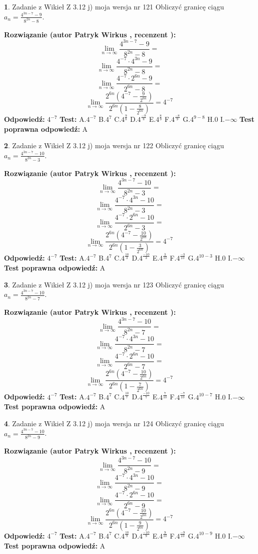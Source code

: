 \documentclass[12pt, a4paper]{article}
\theoremstyle{definition} %
\newtheorem{zad}{}
\newcommand{\zadStart}[1]{\begin{zad}#1\newline}
\newcommand{\zadStop}{\end{zad}}
\newcommand{\rozwStart}[2]{\noindent \textbf{Rozwiązanie (autor #1 , recenzent #2): }\newline}
\newcommand{\rozwStop}{\newline}
\newcommand{\odpStart}{\noindent \textbf{Odpowiedź:}\newline}
\newcommand{\odpStop}{\newline}
\newcommand{\testStart}{\noindent \textbf{Test:}\newline}
\newcommand{\testStop}{\newline}
\newcommand{\kluczStart}{\noindent \textbf{Test poprawna odpowiedź:}\newline}
\newcommand{\kluczStop}{\newline}
\begin{document}
\zadStart{Zadanie z Wikieł Z 3.12 j) moja wersja nr 121}
Obliczyć granicę ciągu $a_{n}=\frac{4^{3n-7}-9}{8^{2n}-8}$.
\zadStop
\rozwStart{Patryk Wirkus}{}
$$\lim\limits_{n\to\infty}\frac{4^{3n-7}-9}{8^{2n}-8}=$$
$$\lim\limits_{n\to\infty}\frac{4^{-7} \cdot 4^{3n}-9}{8^{2n}-8}=$$
$$\lim\limits_{n\to\infty}\frac{4^{-7} \cdot 2^{6n}-9}{2^{6n}-8}=$$
$$\lim\limits_{n\to\infty}\frac{2^{6n}(4^{-7} - \frac{9}{2^{6n}})}{2^{6n}(1-\frac{8}{2^{6n}})}= 4^{-7}$$
\rozwStop
\odpStart
$4^{-7}$
\odpStop
\testStart
A.$4^{-7}$
B.$4^{7}$
C.$4^{\frac{9}{8}}$
D.$4^{\frac{-9}{8}}$
E.$4^{\frac{8}{9}}$
F.$4^{\frac{-8}{9}}$
G.$4^{9-8}$
H.$0$
I.$-\infty$
\testStop
\kluczStart
A
\kluczStop



\zadStart{Zadanie z Wikieł Z 3.12 j) moja wersja nr 122}
Obliczyć granicę ciągu $a_{n}=\frac{4^{3n-7}-10}{8^{2n}-3}$.
\zadStop
\rozwStart{Patryk Wirkus}{}
$$\lim\limits_{n\to\infty}\frac{4^{3n-7}-10}{8^{2n}-3}=$$
$$\lim\limits_{n\to\infty}\frac{4^{-7} \cdot 4^{3n}-10}{8^{2n}-3}=$$
$$\lim\limits_{n\to\infty}\frac{4^{-7} \cdot 2^{6n}-10}{2^{6n}-3}=$$
$$\lim\limits_{n\to\infty}\frac{2^{6n}(4^{-7} - \frac{10}{2^{6n}})}{2^{6n}(1-\frac{3}{2^{6n}})}= 4^{-7}$$
\rozwStop
\odpStart
$4^{-7}$
\odpStop
\testStart
A.$4^{-7}$
B.$4^{7}$
C.$4^{\frac{10}{3}}$
D.$4^{\frac{-10}{3}}$
E.$4^{\frac{3}{10}}$
F.$4^{\frac{-3}{10}}$
G.$4^{10-3}$
H.$0$
I.$-\infty$
\testStop
\kluczStart
A
\kluczStop



\zadStart{Zadanie z Wikieł Z 3.12 j) moja wersja nr 123}
Obliczyć granicę ciągu $a_{n}=\frac{4^{3n-7}-10}{8^{2n}-7}$.
\zadStop
\rozwStart{Patryk Wirkus}{}
$$\lim\limits_{n\to\infty}\frac{4^{3n-7}-10}{8^{2n}-7}=$$
$$\lim\limits_{n\to\infty}\frac{4^{-7} \cdot 4^{3n}-10}{8^{2n}-7}=$$
$$\lim\limits_{n\to\infty}\frac{4^{-7} \cdot 2^{6n}-10}{2^{6n}-7}=$$
$$\lim\limits_{n\to\infty}\frac{2^{6n}(4^{-7} - \frac{10}{2^{6n}})}{2^{6n}(1-\frac{7}{2^{6n}})}= 4^{-7}$$
\rozwStop
\odpStart
$4^{-7}$
\odpStop
\testStart
A.$4^{-7}$
B.$4^{7}$
C.$4^{\frac{10}{7}}$
D.$4^{\frac{-10}{7}}$
E.$4^{\frac{7}{10}}$
F.$4^{\frac{-7}{10}}$
G.$4^{10-7}$
H.$0$
I.$-\infty$
\testStop
\kluczStart
A
\kluczStop



\zadStart{Zadanie z Wikieł Z 3.12 j) moja wersja nr 124}
Obliczyć granicę ciągu $a_{n}=\frac{4^{3n-7}-10}{8^{2n}-9}$.
\zadStop
\rozwStart{Patryk Wirkus}{}
$$\lim\limits_{n\to\infty}\frac{4^{3n-7}-10}{8^{2n}-9}=$$
$$\lim\limits_{n\to\infty}\frac{4^{-7} \cdot 4^{3n}-10}{8^{2n}-9}=$$
$$\lim\limits_{n\to\infty}\frac{4^{-7} \cdot 2^{6n}-10}{2^{6n}-9}=$$
$$\lim\limits_{n\to\infty}\frac{2^{6n}(4^{-7} - \frac{10}{2^{6n}})}{2^{6n}(1-\frac{9}{2^{6n}})}= 4^{-7}$$
\rozwStop
\odpStart
$4^{-7}$
\odpStop
\testStart
A.$4^{-7}$
B.$4^{7}$
C.$4^{\frac{10}{9}}$
D.$4^{\frac{-10}{9}}$
E.$4^{\frac{9}{10}}$
F.$4^{\frac{-9}{10}}$
G.$4^{10-9}$
H.$0$
I.$-\infty$
\testStop
\kluczStart
A
\kluczStop
\end{document}

